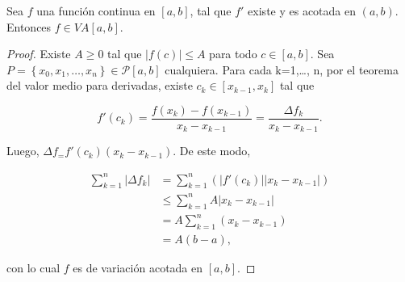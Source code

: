 \begin{lemma}

Sea $f$ una función continua en $\left[a,b\right]$, tal que $f'$ existe y es acotada en $\left(a,b\right)$. Entonces $f\in VA\left[a,b\right]$.

\end{lemma}

\begin{proof}

Existe $A\geq 0$ tal que $|f\left(c\right)| \leq A$ para todo $c \in \left[a,b\right]$. Sea $P= \left\lbrace x_0, x_1, \dots, x_n \right\rbrace \in \mathcal{P}\left[a,b\right]$ cualquiera. Para cada k=1,\dots, n, por el teorema del valor medio para derivadas, existe $c_k\in \left[x_{k-1},x_k\right]$ tal que 

\begin{equation*}
  f'\left(c_k\right)=\frac{f\left(x_k\right)-f\left(x_{k-1}\right)}{x_k-x_{k-1}}=\frac{\Delta f_k}{x_k-x_{k-1}}.
\end{equation*}

Luego, $\Delta f_ = f'\left(c_k\right)\left(x_k-x_{k-1}\right)$. De este modo,

\begin{align*}
  \sum_{k=1}^{n}|\Delta f_{k}|&=\sum_{k=1}^{n}\left(|f'\left(c_k\right)||x_k-x_{k-1}|\right)\\
  &\leq \sum_{k=1}^{n}A|x_k-x_{k-1}|\\
  &=A\sum_{k=1}^{n}\left(x_k-x_{k-1}\right)\\
  &=A\left(b-a\right),
\end{align*}

con lo cual $f$ es de variación acotada en $\left[a,b\right]$.

\end{proof}
